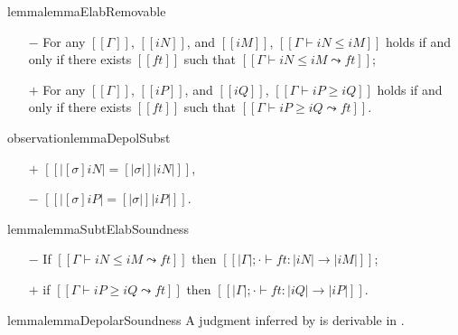 \begin{restatable}{lemma}{lemmaElabRemovable}
  \label{lemma:elab-removable}
  \hfill
  \begin{itemize}
    \item [$-$] For any $[[Γ]]$, $[[iN]]$, and $[[iM]]$, 
      $[[Γ ⊢ iN ≤ iM]]$ holds if and only if 
      there exists $[[ft]]$ such that $[[Γ ⊢ iN ≤ iM ⤳ ft]]$;
    \item [$+$] For any $[[Γ]]$, $[[iP]]$, and $[[iQ]]$, 
      $[[Γ ⊢ iP ≥ iQ]]$ holds if and only if
      there exists $[[ft]]$ such that $[[Γ ⊢ iP ≥ iQ ⤳ ft]]$.
  \end{itemize}
\end{restatable}


\begin{restatable}{observation}{lemmaDepolSubst}
  \label{lemma:depol-subst}
  \hfill
  \begin{itemize}
    \item [$+$] $[[ |[σ]iN| = [|σ|]|iN| ]]$,
    \item [$-$] $[[ |[σ]iP| = [|σ|]|iP| ]]$.
  \end{itemize}
\end{restatable}


\begin{restatable}{lemma}{lemmaSubtElabSoundness}
  \label{lemma:subt-elab-soundness}
  \hfill
  \begin{itemize}
    \item [$-$] If $[[Γ ⊢ iN ≤ iM ⤳ ft]]$ then $[[|Γ| ; · ⊢ ft : |iN| → |iM| ]]$;
    \item [$+$] if $[[Γ ⊢ iP ≥ iQ ⤳ ft]]$ then $[[|Γ| ; · ⊢ ft : |iQ| → |iP| ]]$.
  \end{itemize}
\end{restatable}


\begin{restatable}{lemma}{lemmaDepolarSoundness}
  \label{lemma:depolar-soundness}
  A judgment inferred by \fexists is derivable in \systemf.\\
\end{restatable}

